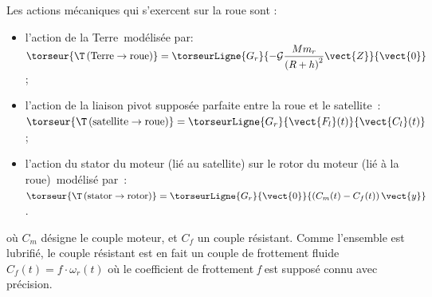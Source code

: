 Les actions mécaniques qui s'exercent sur la roue sont :

\begin{itemize}
\item l'action de la Terre~modélisée par: $
\torseur{\T\left(\text{Terre}\to \text{roue}\right)}=\torseurLigne{G_r}{-\mathcal{G}\dfrac{Mm_r}{\left(R+h\right)^2}\vect{Z}}{\vect{0}}$;   
\item l'action de la liaison pivot supposée parfaite entre la roue et le
  satellite~: 
$\torseur{\T\left(\text{satellite}\to \text{roue}\right)}=\torseurLigne{G_r}{\vect{F_l}(t)}{\vect{C_l}(t)} $;
  \item l'action du stator du moteur (lié au satellite) sur le rotor du moteur (lié à la roue)~modélisé par~:
  $\torseur{\T\left(\text{stator}\to \text{rotor}\right)}=\torseurLigne{G_r}{\vect{0}}{\left(C_m(t)-C_f(t)\right)\vect{y}}
$.
\end{itemize}

où $C_{m}$ désigne le couple moteur, et $C_{f}$ un
couple résistant. Comme l'ensemble est lubrifié, le couple résistant est
en fait un couple de frottement fluide $C_f(t)=f\cdot \omega_r(t)$ où le coefficient de frottement
\emph{f} est supposé connu avec précision.
\fi


